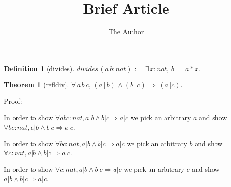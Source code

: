 \documentclass[11pt, oneside]{article}
\title{Brief Article}
\author{The Author}
\date{}							%
\newtheorem{Theorem}{Theorem}
\newtheorem{Definition}{Definition}
\begin{document}
\maketitle

\begin{Definition}[divides] 
$divides\,(a\,b:nat)\,:=\,∃\,x:nat,\,b\,=\,a*x.
$
 \end{Definition}
\begin{Theorem}[refldiv] 
$\forall \,a\,b\,c,\,(a\,|\,b)\,\land (b\,|\,c)\,\Rightarrow \,(a\,|c).$
 \end{Theorem}


 Proof: \begin{subproof}In order to show $\forall a b c : nat, a | b \land b | c \Rightarrow a | c $ we pick an arbitrary $a$ and show $\forall b c : nat, a | b \land b | c \Rightarrow a | c $.

 \begin{subproof}In order to show $\forall b c : nat, a | b \land b | c \Rightarrow a | c $ we pick an arbitrary $b$ and show $\forall c : nat, a | b \land b | c \Rightarrow a | c $.

 \begin{subproof}In order to show $\forall c : nat, a | b \land b | c \Rightarrow a | c $ we pick an arbitrary $c$ and show $a | b \land b | c \Rightarrow a | c $.


\end{subproof}
\end{subproof}
\end{subproof}
\end{document}
